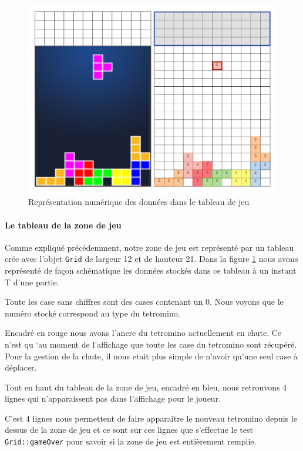 \documentclass[a4paper, 12pt]{article}
\begin{document}
			\begin{figure}[bt]
				\centering
				\includegraphics[scale=0.35]{img/grid.png}
				\caption{Représentation numérique des données dans le tableau de jeu}
				\label{fig:grid}
			\end{figure}

			\paragraph{Le tableau de la zone de jeu}

			Comme expliqué précédemment, notre zone de jeu est représenté par un tableau crée avec l’objet \texttt{Grid} de largeur 12 et de hauteur 21. Dans la figure \ref{fig:grid} nous avons représenté de façon schématique les données stockés dans ce tableau à un instant T d’une partie.

			Toute les case sans chiffres sont des cases contenant un 0. Nous voyons que le numéro stocké correspond au type du tetromino.

			Encadré en rouge nous avons l’ancre du tetromino actuellement en chute. Ce n’est qu ‘au moment de l’affichage que toute les case du tetromino sont récupéré. Pour la gestion de la chute, il nous etait plus simple de n’avoir qu’une seul case à déplacer. 

			Tout en haut du tableau de la zone de jeu, encadré en bleu, nous retrouvons 4 lignes qui n’apparaissent pas dans l’affichage pour le joueur.

			C’est 4 lignes nous permettent de faire apparaître le nouveau tetromino depuis le dessus de la zone de jeu et ce sont sur ces lignes que s’effectue le test \texttt{Grid::gameOver} pour savoir si la zone de jeu est entièrement remplie.
\end{document}
